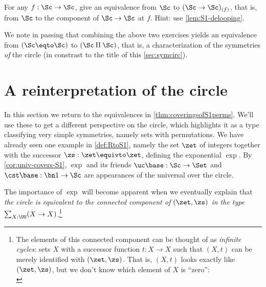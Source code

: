 \begin{xca}\label{xca:(S1->S1)_(f)-eqv-S1}
For any $f: \Sc\to\Sc$, give an equivalence
from $\Sc$ to $(\Sc\to\Sc)_{(f)}$, that is, from $\Sc$ to
the component of $\Sc\to\Sc$ at $f$.
Hint: use \cref{lem:S1-delooping}.
\end{xca}

We note in passing that combining the above two exercises
yields an equivalence from $(\Sc\eqto\Sc)$ to $(\Sc\amalg\Sc)$,
that is, a characterization of the symmetries \emph{of} the circle
(in constrast to the title of this \cref{sec:symcirc}).


\section{A reinterpretation of the circle}\label{sec:S1isC}

In this section we return to the equivalences in \cref{thm:coveringsofS1perms}.
We'll use these to get a different perspective on the circle,
which highlights it as a type classifying very simple symmetries,
namely sets with permutations.
We have already seen one example in \cref{def:RtoS1},
namely the set $\zet$ of integers together with the successor
$\zs: \zet\equivto\zet$, defining the exponential \covering $\exp$.
By \cref{cor:univ-covers-S1}, $\exp$ and its friends
$\uc\base:\Sc \to \Set$ and $\cst\base : \bn 1 \to \Sc$
are appearances of the universal \covering over the circle.

The importance of $\exp$ will become apparent when we eventually
explain that \emph{the circle is equivalent to the connected component of
  $(\zet,\zs)$ in the type $\sum_{X:\UU}(X\to X)$}.\footnote{%
  The elements of this connected component can be thought of as
  \emph{infinite cycles}:
  sets $X$ with a successor function $t:X \to X$
  such that $(X,t)$ can be merely identified with $(\zet,\zs)$.
  That is, $(X,t)$ looks exactly like $(\zet,\zs)$,
  but we don't know which element of $X$ is ``zero'':\\[1ex]
  }

